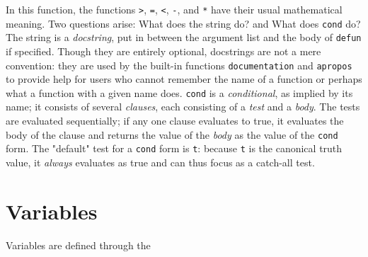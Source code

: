 \documentclass[10pt]{book}
\begin{document}
In this function, the functions \texttt{>}, \texttt{=}, \texttt{<}, \texttt{-}, and \texttt{*} have their usual mathematical meaning. Two questions arise: What does the string do? and What does \texttt{cond} do? The string is a \textit{docstring}, put in between the argument list and the body of \texttt{defun} if specified. Though they are entirely optional, docstrings are not a mere convention: they are used by the built-in functions \texttt{documentation} and \texttt{apropos} to provide help for users who cannot remember the name of a function or perhaps what a function with a given name does. %
 \texttt{cond} is a \textit{conditional}, as implied by its name; it consists of several \textit{clauses}, each consisting of a \textit{test} and a \textit{body}. The tests are evaluated sequentially; if any one clause evaluates to true, it evaluates the body of the clause and returns the value of the \textit{body} as the value of the \texttt{cond} form. The "default" test for a \texttt{cond} form is \texttt{t}: because \texttt{t} is the canonical truth value, it \textit{always} evaluates as true and can thus focus as a catch-all test.\\
\section{Variables}
Variables are defined through the 
\end{document}
